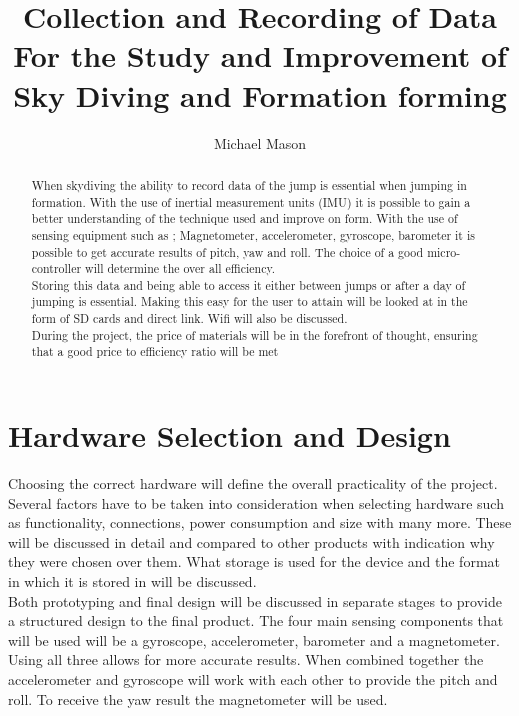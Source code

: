 \documentclass{report}
\begin{document}
\title{Collection and Recording of Data For the Study and Improvement of Sky Diving and Formation forming}
\author{Michael Mason}

\maketitle


\begin{abstract}
When skydiving the ability to record data of the jump is essential when jumping in formation. With the use of inertial measurement units (IMU) it is possible to gain a better understanding of the technique used and improve on form. With the use of sensing equipment such as ; Magnetometer, accelerometer, gyroscope, barometer it is possible to get accurate results of pitch, yaw and roll. The choice of a good micro-controller will determine the over all efficiency.\\
Storing this data and being able to access it either between jumps or after a day of jumping is essential. Making this easy for the user to attain will be looked at in the form of SD cards and direct link. Wifi will also be discussed.\\
During the project, the price of materials will be in the forefront of thought, ensuring that a good price to efficiency ratio will be met

\end{abstract}

\tableofcontents



\chapter{Hardware Selection and Design}
Choosing the correct hardware will define the overall practicality of the project. Several factors have to be taken into consideration when selecting hardware such as functionality, connections, power consumption and size with many more. These will be discussed in detail and compared to other products with indication why they were chosen over them. What storage is used for the device and the format in which it is stored in will be discussed.\\
Both prototyping and final design will be discussed in separate stages to provide a structured design to the final product.
The four main sensing components that will be used will be a gyroscope, accelerometer, barometer and a magnetometer. Using all three allows for more accurate results. When combined together the accelerometer and gyroscope will work with each other to provide the pitch and roll. To receive the yaw result the magnetometer will be used.
\end{document}
